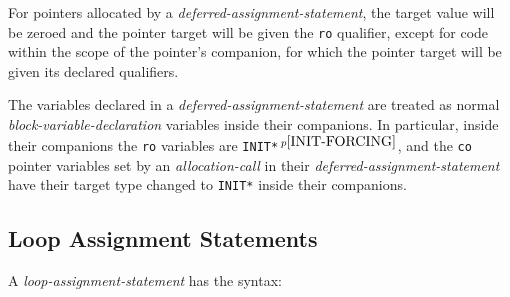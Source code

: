 \documentclass[12pt]{article}
\newcommand{\pagnote}[1]{$\,^{p\pageref{#1}}$}
\begin{document}
For pointers allocated by a {\em deferred-assignment-statement},
the target value will be zeroed and
the pointer target will be given the {\tt ro} qualifier, except for
code within the scope of the pointer's companion,
for which the pointer target will be given its declared qualifiers.


The variables declared in a {\em deferred-assignment-statement} are treated as
normal {\em block-vari\-able-declaration} variables inside their companions.
In particular, inside their companions
the {\tt ro} variables are {\tt *INIT*}\pagnote{INIT-FORCING},
and the {\tt co} pointer variables set by
an {\em allocation-call} in their {\em deferred-assignment-statement}
have their target type changed to {\tt *INIT*}
inside their companions.

\subsection{Loop Assignment Statements}
\label{LOOP-ASSIGNMENT-STATEMENTS}

A {\em loop-assignment-statement} has the syntax:
\end{document}
